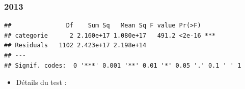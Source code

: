 \documentclass[mstat,12pt]{unswthesis}
\begin{document}
\newpage

\subsubsection{\texorpdfstring{\textbf{2013}}{2013}}\label{section-1}

\medskip

\begin{verbatim}
##               Df    Sum Sq   Mean Sq F value Pr(>F)    
## categorie      2 2.160e+17 1.080e+17   491.2 <2e-16 ***
## Residuals   1102 2.423e+17 2.198e+14                   
## ---
## Signif. codes:  0 '***' 0.001 '**' 0.01 '*' 0.05 '.' 0.1 ' ' 1
\end{verbatim}

\medskip

\begin{itemize}
\tightlist
\item
  Détails du test :
\end{itemize}

\medskip
\end{document}
